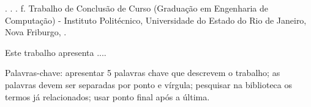 





\begin{resumo}
\begin{SingleSpace}

\noindent
\begin{flushleft}
\entradaAutor{}. \textit{\imprimirtitulo}. \the\year. \pageref{LastPage} f. Trabalho de Conclusão de Curso (Graduação em Engenharia de Computação) - Instituto Politécnico, Universidade do Estado do Rio de Janeiro, Nova Friburgo, \the\year.
\end{flushleft}
\vspace{\onelineskip}

\setlength{\parindent}{1.3cm}

Este trabalho apresenta .... 

\vspace{\onelineskip}
\noindent Palavras-chave:  apresentar 5 palavras chave que descrevem o trabalho; as palavras devem ser separadas por ponto e vírgula; pesquisar na biblioteca os termos já relacionados; usar ponto final após a última.

\end{SingleSpace}
\end{resumo}
